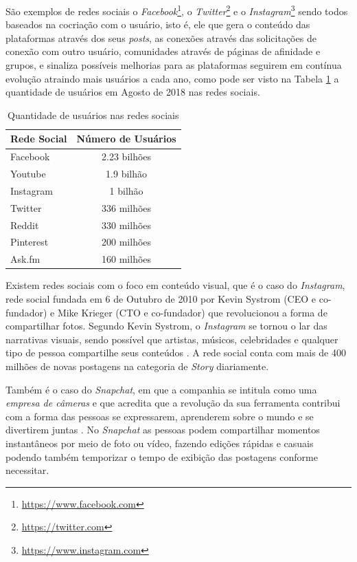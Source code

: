 São exemplos de redes sociais o \textit{Facebook}\footnote{\url{https://www.facebook.com}}, o \textit{Twitter}\footnote{\url{https://twitter.com}} e o \textit{Instagram}\footnote{\url{https://www.instagram.com}} sendo todos baseados na cocriação com o usuário, isto é, ele que gera o conteúdo das plataformas através dos seus \textit{posts}, as conexões através das solicitações de conexão com outro usuário, comunidades através de páginas de afinidade e grupos, e sinaliza possíveis melhorias para as plataformas seguirem em contínua evolução atraindo mais usuários a cada ano, como pode ser visto na Tabela \ref{tab:qtdusers} a quantidade de usuários em Agosto de 2018 nas redes sociais.


\begin{table}[h]
\centering
\caption{Quantidade de usuários nas redes sociais}
\label{tab:qtdusers}
\begin{tabular}{|l|c|}
\hline
\textbf{Rede Social}&  \textbf{Número de Usuários} \\ \hline
Facebook     &     2.23 bilhões   \\ \hline
Youtube      &     1.9  bilhão    \\ \hline
Instagram    &     1    bilhão    \\ \hline
Twitter      &     336  milhões   \\ \hline
Reddit       &     330  milhões    \\ \hline
Pinterest    &     200  milhões    \\ \hline
Ask.fm       &     160  milhões    \\ \hline
\end{tabular}
\end{table}

Existem redes sociais com o foco em conteúdo visual, que é o caso do \textit{Instagram}, rede social fundada em 6 de Outubro de 2010 por Kevin Systrom (CEO e co-fundador) e Mike Krieger (CTO e co-fundador) que revolucionou a forma de compartilhar fotos. Segundo Kevin Systrom, o \textit{Instagram} se tornou o lar das narrativas visuais, sendo possível que artistas, músicos, celebridades e qualquer tipo de pessoa compartilhe seus conteúdos \cite{instagram_2018}. A rede social conta com mais de 400 milhões de novas postagens na categoria de \textit{Story} diariamente. 

Também é o caso do \textit{Snapchat}, em que a companhia se intitula como uma \textit{empresa de câmeras} e que acredita que a revolução da sua ferramenta contribui com a forma das pessoas se expressarem, aprenderem sobre o mundo e se divertirem juntas \cite{snapchat_2018}. No \textit{Snapchat} as pessoas podem compartilhar momentos instantâneos por meio de foto ou vídeo, fazendo edições rápidas e casuais podendo também temporizar o tempo de exibição das postagens conforme necessitar.

